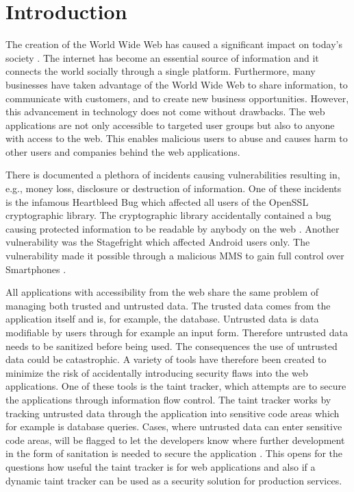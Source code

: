 \chapter{Introduction}
\label{Introduction}
The creation of the World Wide Web has caused a significant impact on today's society \parencite{www}. The internet has become an essential source of information and it connects the world socially through a single platform. Furthermore, many businesses have taken advantage of the World Wide Web to share information, to communicate with customers, and to create new business opportunities. However, this advancement in technology does not come without drawbacks. The web applications are not only accessible to targeted user groups but also to anyone with access to the web. This enables malicious users to abuse and causes harm to other users and companies behind the web applications.

There is documented a plethora of incidents causing vulnerabilities resulting in, e.g., money loss, disclosure or destruction of information. One of these incidents is the infamous Heartbleed Bug which affected all users of the OpenSSL cryptographic library. The cryptographic library accidentally contained a bug causing protected information to be readable by anybody on the web \parencite{Heartbleed}. Another vulnerability was the Stagefright which affected Android users only. The vulnerability made it possible through a malicious MMS to gain full control over Smartphones \parencite{2015ASvt}. 

All applications with accessibility from the web share the same problem of managing both trusted and untrusted data. The trusted data comes from the application itself and is, for example, the database. Untrusted data is data modifiable by users through for example an input form. Therefore untrusted data needs to be sanitized before being used. The consequences the use of untrusted data could be catastrophic. A variety of tools have therefore been created to minimize the risk of accidentally introducing security flaws into the web applications. One of these tools is the taint tracker, which attempts are to secure the applications through information flow control. The taint tracker works by tracking untrusted data through the application into sensitive code areas which for example is database queries. Cases, where untrusted data can enter sensitive code areas, will be flagged to let the developers know where further development in the form of sanitation is needed to secure the application \parencite{Pan2015, Venkataramani2008}. This opens for the questions how useful the taint tracker is for web applications and also if a dynamic taint tracker can be used as a security solution for production services.



